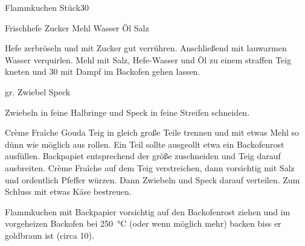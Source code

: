 \begin{MyRecipe}{Flammkuchen}{ Stück}{\SI{30}{\minuteprime} }
	
	\ingredient[\Calc{20}{\x}]{\si{\gram}} {Frischhefe}
	\ingredient[\Calc{1}{\x}]{\si{\Teeloeffel}} {Zucker}
	\ingredient[\Calc{0.4}{\x}]{\si{\kilogram}} {Mehl}
	\ingredient[\Calc{0.2}{\x}]{\si{\liter}} {Wasser}
	\ingredient[\Calc{4}{\x}]{\si{\Essloeffel}} {Öl}
	\ingredient[]{} {Salz}
	
	Hefe zerbröseln und mit Zucker gut verrühren. Anschließend mit lauwarmen Wasser verquirlen. Mehl mit Salz, Hefe-Wasser und Öl zu einem straffen Teig kneten und \SI{30}{\minuteprime} mit Dampf im Backofen gehen lassen.\par\bigskip
	
	\ingredient[\Calc{1}{\x}]{} {gr. Zwiebel}
	\ingredient[\Calc{0.1}{\x}]{\si{\kilogram}} {Speck}
	
	Zwiebeln in feine Halbringe und Speck in feine Streifen schneiden.\par\bigskip

	\ingredient[\Calc{0.5}{\x}]{\si{\kilogram}} {Crème Fraîche}
	\ingredient[\Calc{0.1}{\x}]{\si{\kilogram}} {Gouda}
	Teig in gleich große Teile trennen und mit etwas Mehl so dünn wie möglich aus rollen. Ein Teil sollte ausgeollt etwa ein Backofenrost ausfüllen. Backpapiet entsprechend der größe zuschneiden und Teig darauf ausbreiten. Crème Fraîche auf dem Teig verstreichen, dann vorsichtig mit Salz und ordentlich Pfeffer würzen. Dann Zwiebeln und Speck darauf verteilen. Zum Schluss mit etwas Käse bestreuen.\par\bigskip

	Flammkuchen mit Backpapier vorsichtig auf den Backofenrost ziehen und im vorgeheizen Backofen bei \SI{250}{\celsius} (oder wenn möglich mehr) backen biss er goldbraun ist (circa \SI{10}{\minuteprime}).
	
	
	
\end{MyRecipe}